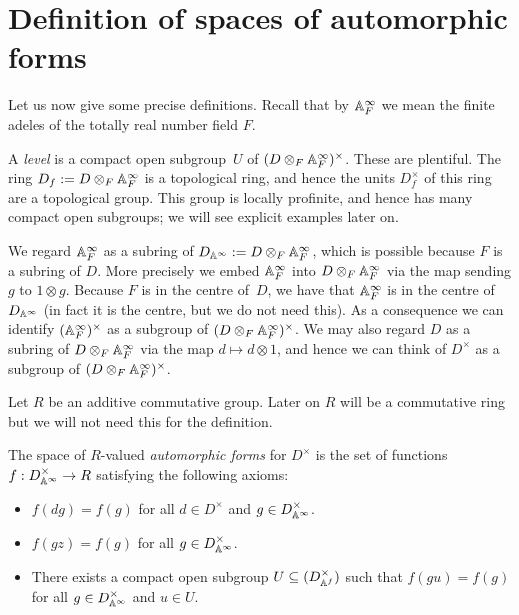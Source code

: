 \section{Definition of spaces of automorphic forms}

Let us now give some precise definitions. Recall that by $\mathbb{A}_F^\infty$ we mean the finite adeles of the totally real number field $F$.

A \emph{level} is a compact open subgroup~$U$ of $(D\otimes_F\mathbb{A}_F^\infty)^\times$. These are
plentiful. The ring $D_f:=D\otimes_F\mathbb{A}_F^\infty$ is a topological ring,
and hence the units $D_f^\times$ of this ring
are a topological group. This group is locally profinite, and hence has many compact open subgroups;
we will see explicit examples later on.

We regard $\mathbb{A}_F^\infty$ as a subring of $D_{\mathbb{A}^\infty}:=D\otimes_F\mathbb{A}_F^\infty$, which is possible because
$F$ is a subring of $D$. More precisely we embed $\mathbb{A}_F^\infty$ into $D\otimes_F\mathbb{A}_F^\infty$
via the map sending $g$ to $1\otimes g$. Because $F$ is in the centre of~$D$, we have
that $\mathbb{A}_F^\infty$ is in the centre of $D_{\mathbb{A}^\infty}$ (in fact it is the centre, but we do not need this).
As a consequence we can identify $(\mathbb{A}_F^\infty)^\times$ as a subgroup of $(D\otimes_F\mathbb{A}_F^\infty)^\times$.
We may also regard $D$ as a subring of $D\otimes_F\mathbb{A}_F^\infty$ via the map $d\mapsto d\otimes 1$, and hence
we can think of $D^\times$ as a subgroup of $(D\otimes_F\mathbb{A}_F^\infty)^\times$.

Let $R$ be an additive commutative group. Later on $R$ will be a commutative ring but we will not need this for the definition.
\begin{definition}
  \label{TotallyDefiniteQuaternionAlgebra.WeightTwoAutomorphicForm}
  \leanok
  The space of $R$-valued \emph{automorphic forms} for $D^\times$ is the set of
  functions $f:D_{\mathbb{A}^\infty}^\times\to R$ satisfying the following axioms:
  \begin{itemize}
    \item $f(dg)=f(g)$ for all $d\in D^\times$ and $g\in D_{\mathbb{A}^\infty}^\times$.
    \item $f(gz)=f(g)$ for all $g\in D_{\mathbb{A}^\infty}^\times$.
    \item There exists a compact open subgroup $U\subseteq (D_{\mathbb{A}^f}^\times)$ such that $f(gu)=f(g)$ for all $g\in D_{\mathbb{A}^\infty}^\times$ and $u\in U$.
  \end{itemize}
\end{definition}

